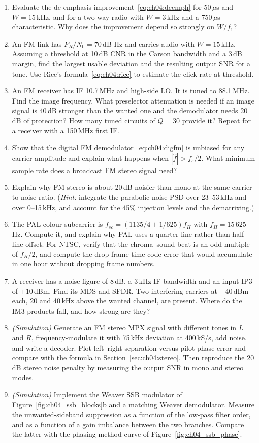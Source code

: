 \begin{enumerate}[label=\thechapter.\arabic*]
Why does broadcast FM with pre-emphasis behave like PM at high audio frequencies?
\item Evaluate the de-emphasis improvement~\eqref{eq:ch04:deemph} for 50\,$\mu$s and $W=15$\,kHz, and for a
two-way radio with $W=3$\,kHz and a 750\,$\mu$s characteristic. Why does the improvement depend so strongly on
$W/f_1$?
\item An FM link has $P_R/N_0=70$\,dB-Hz and carries audio with $W=15$\,kHz. Assuming a threshold at 10\,dB CNR in
the Carson bandwidth and a 3\,dB margin, find the largest usable deviation and the resulting output SNR for a
tone. Use Rice's formula~\eqref{eq:ch04:rice} to estimate the click rate at threshold.
\item An FM receiver has IF 10.7\,MHz and high-side LO. It is tuned to 88.1\,MHz. Find the image frequency. What
preselector attenuation is needed if an image signal is 40\,dB stronger than the wanted one and the demodulator
needs 20\,dB of protection? How many tuned circuits of $Q=30$ provide it? Repeat for a receiver with a 150\,MHz
first IF.
\item Show that the digital FM demodulator~\eqref{eq:ch04:digfm} is unbiased for any carrier amplitude and
explain what happens when $|\hat f|>f_s/2$. What minimum sample rate does a broadcast FM stereo signal need?
\item\label{prob:ch04:stereonoise} Explain why FM stereo is about 20\,dB noisier than mono at the same
carrier-to-noise ratio. (\emph{Hint:} integrate the parabolic noise PSD over 23--53\,kHz and over 0--15\,kHz, and
account for the 45\% injection levels and the dematrixing.)
\item The PAL colour subcarrier is $f_{sc}=(1135/4+1/625)f_H$ with $f_H=15\,625$\,Hz. Compute it, and explain why
PAL uses a quarter-line rather than half-line offset. For NTSC, verify that the chroma--sound beat is an odd
multiple of $f_H/2$, and compute the drop-frame time-code error that would accumulate in one hour without
dropping frame numbers.
\item A receiver has a noise figure of 8\,dB, a 3\,kHz IF bandwidth and an input IP3 of $+10$\,dBm. Find its MDS
and SFDR. Two interfering carriers at $-40$\,dBm each, 20 and 40\,kHz above the wanted channel, are present.
Where do the IM3 products fall, and how strong are they?
\item \emph{(Simulation)} Generate an FM stereo MPX signal with different tones in $L$ and $R$, frequency-modulate
it with 75\,kHz deviation at 400\,kS/s, add noise, and write a decoder. Plot left--right separation versus pilot
phase error and compare with the formula in Section~\ref{sec:ch04:stereo}. Then reproduce the 20\,dB stereo noise
penalty by measuring the output SNR in mono and stereo modes.
\item \emph{(Simulation)} Implement the Weaver SSB modulator of Figure~\ref{fig:ch04_ssb_blocks}b and a matching
Weaver demodulator. Measure the unwanted-sideband suppression as a function of the low-pass filter order, and
as a function of a gain imbalance between the two branches. Compare the latter with the phasing-method curve of
Figure~\ref{fig:ch04_ssb_phase}.
\end{enumerate}

